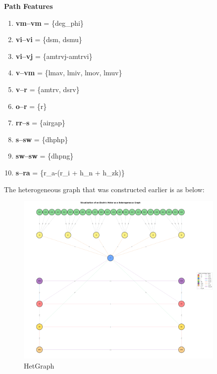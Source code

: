 \documentclass{report} %
\begin{document}
\textbf{Path Features}

\begin{enumerate}

    \item \textbf{vm--vm} = \{deg\_phi\}

    \item \textbf{vi--vi} = \{dsm, dsmu\}

    \item \textbf{vi--vj} = \{amtrvj-amtrvi\}

    \item \textbf{v--vm} = \{lmav, lmiv, lmov, lmuv\}

    \item \textbf{v--r} = \{amtrv, dsrv\}
    
    \item \textbf{o--r} = \{r\}

    \item \textbf{rr--s} = \{airgap\}

    \item \textbf{s--sw} = \{dhphp\}
    
    \item \textbf{sw--sw} = \{dhpng\}
    
    \item \textbf{s--ra} = \{r\_a-(r\_i + h\_n + h\_zk)\}
    
\end{enumerate}
The heterogeneous graph that was constructed earlier is as below:
\begin{figure}[H]
    \centering
    \includegraphics[width=0.9\textwidth]{./ReportImages/graph.png} 
    \caption{HetGraph}
    \label{fig:Graph}
\end{figure}
\end{document}

